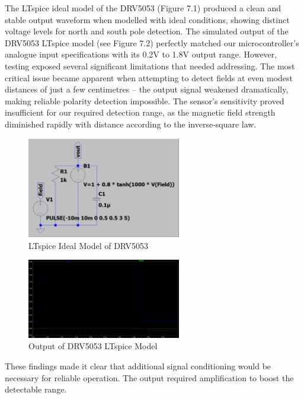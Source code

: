 The LTspice ideal model of the DRV5053 (Figure 7.1) produced a clean and stable output waveform when modelled with ideal conditions, showing distinct voltage levels for north and south pole detection. The simulated output of the DRV5053 LTspice model (see Figure 7.2) perfectly matched our microcontroller's analogue input specifications with its 0.2V to 1.8V output range. However, testing exposed several significant limitations that needed addressing. The most critical issue became apparent when attempting to detect fields at even modest distances of just a few centimetres – the output signal weakened dramatically, making reliable polarity detection impossible. The sensor's sensitivity proved insufficient for our required detection range, as the magnetic field strength diminished rapidly with distance according to the inverse-square law.
\begin{figure}[H]
    \centering
    \includegraphics[width=0.6\textwidth]{subpages/images/magnet_model.png}
    \caption{LTspice Ideal Model of DRV5053}
    \label{fig:ideal_model}
\end{figure}
\begin{figure}[H]
    \centering
    \includegraphics[width=0.6\textwidth]{subpages/images/magnet_out.png}
    \caption{Output of DRV5053 LTspice Model}
    \label{fig:model_output}
\end{figure}
These findings made it clear that additional signal conditioning would be necessary for reliable operation. The output required amplification to boost the detectable range.


